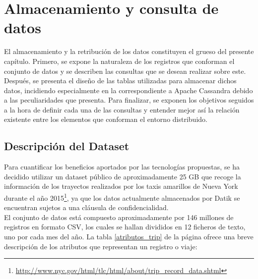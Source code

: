 
\pagestyle{fancy}

\chapter{Almacenamiento y consulta de datos}
\label{almacenamiento_datos}

El almacenamiento y la retribución de los datos constituyen el grueso del presente capítulo. Primero, se expone la naturaleza de los registros que conforman el conjunto de datos y se describen las consultas que se desean realizar sobre este. Después, se presenta el diseño de las tablas utilizadas para almacenar dichos datos, incidiendo especialmente en la correspondiente a Apache Cassandra debido a las peculiaridades que presenta. Para finalizar, se exponen los objetivos seguidos a la hora de definir cada una de las consultas y entender mejor así la relación existente entre los elementos que conforman el entorno distribuido.

\section{Descripción del Dataset}

Para cuantificar los beneficios aportados por las tecnologías propuestas, se ha decidido utilizar un dataset público de aproximadamente 25 GB que recoge la información de los trayectos realizados por los taxis amarillos de Nueva York durante el año 2015\footnote{\url{http://www.nyc.gov/html/tlc/html/about/trip_record_data.shtml}}, ya que los datos actualmente almacenados por Datik se encuentran sujetos a una cláusula de confidencialidad.\\

El conjunto de datos está compuesto aproximadamente por 146 millones de registros en formato CSV, los cuales se hallan divididos en 12 ficheros de texto, uno por cada mes del año. La tabla \ref{atributos_trip} de la página \pageref{atributos_trip} ofrece una breve descripción de los atributos que representan un registro o viaje: 

